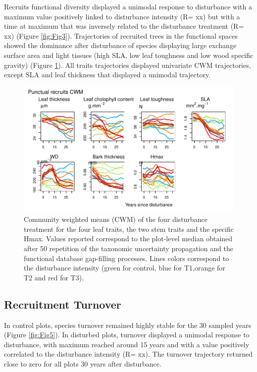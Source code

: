 \documentclass[fleqn,10pt]{ArtEcoFoG} %
\begin{document}
Recruits functional diversity displayed a unimodal response to
disturbance with a maximum value positively linked to disturbance
intensity (R= xx) but with a time at maximum that was inversely related
to the disturbance treatment (R= xx) (Figure \ref{fig:Fig3}).
Trajectories of recruited trees in the functional spaces showed the
dominance after disturbance of species displaying large exchange surface
area and light tissues (high SLA, low leaf toughness and low wood
specific gravity) (Figure \ref{fig:Fig4}). All traits trajectories
displayed univariate CWM trajectories, except SLA and leaf thickness
that displayed a unimodal trajectory.

\begin{figure}

{\centering \includegraphics[width=0.8\linewidth]{RecruitmentTrajectories_files/figure-latex/Fig4-1} 

}

\caption{Community weighted means (CWM) of the four disturbance treatment for the four leaf traits, the two stem traits  and the specific Hmax. Values reported correspond to the plot-level median obtained after 50 repetition of the taxonomic uncertainty propagation and the functional database gap-filling processes. Lines colors correspond to the disturbance intensity (green for control, blue for T1,orange for T2 and red for T3).}\label{fig:Fig4}
\end{figure}

\subsection{Recruitment Turnover}\label{recruitment-turnover}

In control plots, species turnover remained highly stable for the 30
sampled years (Figure \ref{fig:Fig5}). In disturbed plots, turnover
displayed a unimodal response to disturbance, with maximum reached
around 15 years and with a value positively correlated to the
disturbance intensity (R= xx). The turnover trajectory returned close to
zero for all plots 30 years after disturbance.
\end{document}
